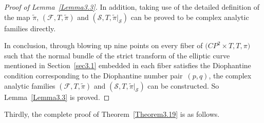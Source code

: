 \documentclass[10pt,a4paper]{amsart}
\numberwithin{equation}{section}
\def\operatorname#1{#1}
\begin{document}
\begin{proof}[Proof of Lemma~\ref{Lemma3.3}]
In addition, taking use of the detailed definition of the map $\widetilde{\pi}$, $(\mathcal{F},T, \widetilde{\pi})$ and $(\mathcal{S},T, \widetilde{\pi}|_\mathcal{S})$ can be proved to be complex analytic families directly.

In conclusion, through blowing up nine points on every fiber of $\bigl(\operatorname{CP}^2 \times T,T, \pi\bigr)$ such that the normal bundle of the strict transform of the elliptic curve mentioned in Section~\ref{sec3.1} embedded in each fiber satisfies the Diophantine condition corresponding to the Diophantine number pair~$(p,q)$, the complex analytic families $(\mathcal{F},T, \widetilde{\pi})$ and $(\mathcal{S},T, \widetilde{\pi}|_\mathcal{S})$ can be constructed. So Lemma~\ref{Lemma3.3} is proved.
\end{proof}

Thirdly, the complete proof of Theorem~\ref{Theorem3.19} is as follows.
\end{document}
